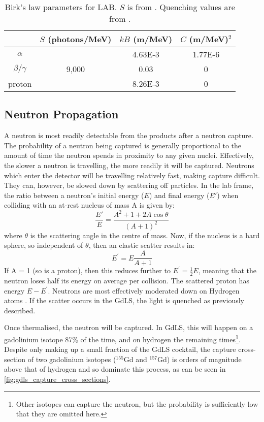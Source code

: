 \begin{table}[]
    \centering
    \begin{tabular}{c | c | c | c }
                   & $S$ (photons/MeV) & $kB$ (m/MeV) & $C$ (m/MeV)$^{2}$ \\ \hline
    $\alpha$       &                   & 4.63E-3 & 1.77E-6 \\
    $\beta/\gamma$ & 9,000             & 0.03    & 0 \\ 
    proton         &                   & 8.26E-3 & 0
    \end{tabular}
    \caption{Birk's law parameters for LAB. $S$ is from \cite{scotthaselschwardt_thesis_ref}. Quenching values are from \cite{ls_proton_quenching_ref}.}
    \label{tab:Birks_law_parameters}
\end{table} 



\subsection{Neutron Propagation}
\par
A neutron is most readily detectable from the products after a neutron capture.
The probability of a neutron being captured is generally proportional to the amount of time the neutron spends in proximity to any given nuclei.
Effectively, the slower a neutron is travelling, the more readily it will be captured.
Neutrons which enter the detector will be travelling relatively fast, making capture difficult.
They can, however, be slowed down by scattering off particles.
In the lab frame, the ratio between a neutron's initial energy ($E$) and final energy ($E'$) when colliding with an at-rest nucleus of mass A is given by:
\begin{equation}
    \frac{E'}{E} = \frac{A^2 + 1 + 2A\cos{\theta}}{(A + 1)^2}
\end{equation}
where $\theta$ is the scattering angle in the centre of mass.
Now, if the nucleus is a hard sphere, so independent of $\theta$, then an elastic scatter results in:
\begin{equation}
    E^{'} = E\frac{A}{A+1}
\end{equation}
If A = 1 (so is a proton), then this reduces further to $E^{'} = \frac{1}{2}E$, meaning that the neutron loses half its energy on average per collision.
The scattered proton has energy $E - E^{'}$.
Neutrons are most effectively moderated down on Hydrogen atoms \cite{neutron_thermalisation_and_capture_ref}.
If the scatter occurs in the GdLS, the light is quenched as previously described.
\par
Once thermalised, the neutron will be captured.
In GdLS, this will happen on a gadolinium isotope 87\% of the time, and on hydrogen the remaining times\footnote{Other isotopes can capture the neutron, but the probability is sufficiently low that they are omitted here.}.
Despite only making up a small fraction of the GdLS cocktail, the capture cross-section of two gadolinium isotopes (${}^{155}$Gd and ${}^{157}$Gd) is orders of magnitude above that of hydrogen and so dominate this process, as can be seen in \autoref{fig:gdls_capture_cross_sections}.

